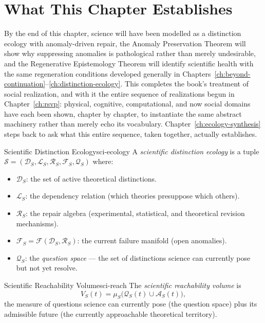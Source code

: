 \documentclass[12pt,twoside,openright]{book}
\newcommand{\adm}{\mathcal{A}}
\begin{document}
\section{What This Chapter Establishes}
\label{sec:ch29-preview}

By the end of this chapter, science will have been modelled
as a distinction ecology with anomaly-driven repair, the
Anomaly Preservation Theorem will show why suppressing
anomalies is pathological rather than merely undesirable, and
the Regenerative Epistemology Theorem will identify scientific
health with the same regeneration conditions developed
generally in Chapters~\ref{ch:beyond-continuation}--\ref{ch:distinction-ecology}.
This completes the book's treatment of social realization, and
with it the entire sequence of realizations begun in
Chapter~\ref{ch:rsvp}: physical, cognitive, computational, and
now social domains have each been shown, chapter by chapter,
to instantiate the same abstract machinery rather than merely
echo its vocabulary. Chapter~\ref{ch:ecology-synthesis} steps
back to ask what this entire sequence, taken together,
actually establishes.

\begin{definition}{Scientific Distinction Ecology}{sci-ecology}
  A \emph{scientific distinction ecology} is a tuple
  $\mathcal{S} = (\mathcal{D}_S, \mathcal{L}_S,
  \mathcal{R}_S, \mathcal{F}_S, \mathcal{Q}_S)$ where:
  \begin{itemize}[nosep]
    \item $\mathcal{D}_S$: the set of active theoretical
          distinctions.
    \item $\mathcal{L}_S$: the dependency relation
          (which theories presuppose which others).
    \item $\mathcal{R}_S$: the repair algebra
          (experimental, statistical, and theoretical
          revision mechanisms).
    \item $\mathcal{F}_S = \mathcal{F}(\mathcal{D}_S,
          \mathcal{R}_S)$: the current failure manifold
          (open anomalies).
    \item $\mathcal{Q}_S$: the \emph{question space} —
          the set of distinctions science can currently
          pose but not yet resolve.
  \end{itemize}
\end{definition}

\begin{definition}{Scientific Reachability Volume}{sci-reach}
  The \emph{scientific reachability volume} is
  \[
    V_S(t)
    = \mu_S\!\bigl(\mathcal{Q}_S(t) \cup \adm_S(t)\bigr),
  \]
  the measure of questions science can currently pose
  (the question space) plus its admissible future
  (the currently approachable theoretical territory).
\end{definition}
\end{document}
